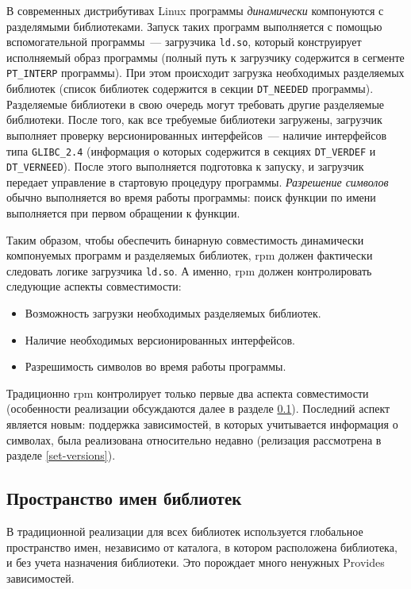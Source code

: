 \documentclass[russian,a4paper,12pt,titlepage]{article}
\begin{document}
В современных дистрибутивах Linux программы \emph{динамически} компонуются с разделямыми библиотеками.
Запуск таких программ выполняется с помощью вспомогательной программы~--- загрузчика \verb|ld.so|,
который конструирует исполняемый образ программы (полный путь к загрузчику содержится в сегменте \verb|PT_INTERP| программы).
При этом происходит загрузка необходимых разделяемых библиотек (список библиотек содержится в секции \verb|DT_NEEDED| программы).
Разделяемые библиотеки в свою очередь могут требовать другие разделяемые библиотеки.  После того, как все требуемые библиотеки
загружены, загрузчик выполняет проверку версионированных интерфейсов~--- наличие интерфейсов типа \verb|GLIBC_2.4| (информация
о которых содержится в секциях \verb|DT_VERDEF| и \verb|DT_VERNEED|).  После этого выполняется подготовка к запуску, и загрузчик
передает управление в стартовую процедуру программы.  \emph{Разрешение символов} обычно выполняется во время работы программы:
поиск функции по имени выполняется при первом обращении к функции.

Таким образом, чтобы обеспечить бинарную совместимость динамически компонуемых программ и разделяемых библиотек,
rpm должен фактически следовать логике загрузчика \verb|ld.so|.  А именно, rpm должен контролировать следующие
аспекты совместимости:
\begin{itemize}
\item Возможность загрузки необходимых разделяемых библиотек.
\item Наличие необходимых версионированных интерфейсов.
\item Разрешимость символов во время работы программы.
\end{itemize}

Традиционно rpm контролирует только первые два аспекта совместимости (особенности реализации обсуждаются
далее в разделе \ref{lib-namespace}).  Последний аспект является новым: поддержка зависимостей, в которых учитывается
информация о символах, была реализована относительно недавно (релизация рассмотрена в разделе \ref{set-versions}).

\subsection{Пространство имен библиотек}
\label{lib-namespace}
В традиционной реализации для всех библиотек используется глобальное пространство имен, независимо
от каталога, в котором расположена библиотека, и без учета назначения библиотеки.  Это порождает
много ненужных Provides зависимостей.
\end{document}
